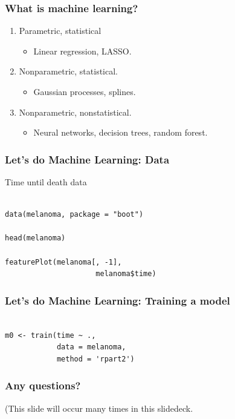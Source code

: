 \documentclass[handout, aspectratio = 169]{beamer}
\begin{document}
\begin{frame}
\frametitle{What is machine learning?}
\begin{enumerate}
\item Parametric, statistical 
\begin{itemize}
\item Linear regression, LASSO.
\end{itemize}

\item Nonparametric, statistical.
\begin{itemize}
\item Gaussian processes, splines.
\end{itemize}
\item Nonparametric, nonstatistical.
\begin{itemize}
\item Neural networks, decision trees, random forest.
\end{itemize}
\end{enumerate}
\end{frame} 

\begin{frame}[fragile]
\frametitle{Let's do Machine Learning: Data}
Time until death data
\begin{Verbatim}

data(melanoma, package = "boot")

head(melanoma)

featurePlot(melanoma[, -1], 
                     melanoma$time)

\end{Verbatim}

\end{frame} 

\begin{frame}[fragile]
\frametitle{ Let's do Machine Learning: Training a model}
\begin{Verbatim}

m0 <- train(time ~ ., 
            data = melanoma,
            method = 'rpart2')

\end{Verbatim}

\end{frame} 



\begin{frame}
\frametitle{Any questions?}

(This slide will occur many times in this slidedeck.

\end{frame} 
\end{document}
